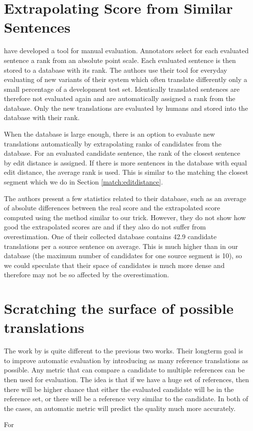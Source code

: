 \section{Extrapolating Score from Similar Sentences}

 have developed a tool for manual evaluation.
Annotators select for each evaluated sentence a rank from an absolute point
scale. Each evaluated sentence is then stored to a database with its rank. The
authors use their tool for everyday evaluating of new variants of their system
which often translate differently only a small percentage of a development test
set. Identically translated sentences are therefore not evaluated again and are
automatically assigned a rank from the database. Only the new translations are
evaluated by humans and stored into the database with their rank.

When the database is large enough, there is an option to evaluate new
translations automatically by extrapolating ranks of candidates from the
database.  For an evaluated candidate sentence, the rank of the closest
sentence by edit distance is assigned. If there is more sentences in the
database with equal edit distance, the average rank is used. This is similar to
the matching the closest segment which we do in Section
\ref{match:editdistance}.

The authors present a few statistics related to their database, such as an
average of absolute differences between the real score and the extrapolated
score computed using the method similar to our  trick.
However, they do not show how good the extrapolated scores are and if they also
do not suffer from overestimation. One of their collected database contains
42.9 candidate translations per a source sentence on average. This is much
higher than in our database (the maximum number of candidates for one source
segment is 10), so we could speculate that their space of candidates is much
more dense and therefore may not be so affected by the overestimation.

\section{Scratching the surface of possible translations}

The work by  is quite different to the previous
two works. Their longterm goal is to improve automatic evaluation by
introducing as many reference translations as possible. Any metric that can
compare a candidate to multiple references can be then used for evaluation. The
idea is that if we have a huge set of references, then there will be higher chance that
either the evaluated candidate will be in the reference set, or there will be a
reference very similar to the candidate. In both of the cases, an automatic metric 
will predict the quality much more accurately. 

For 
